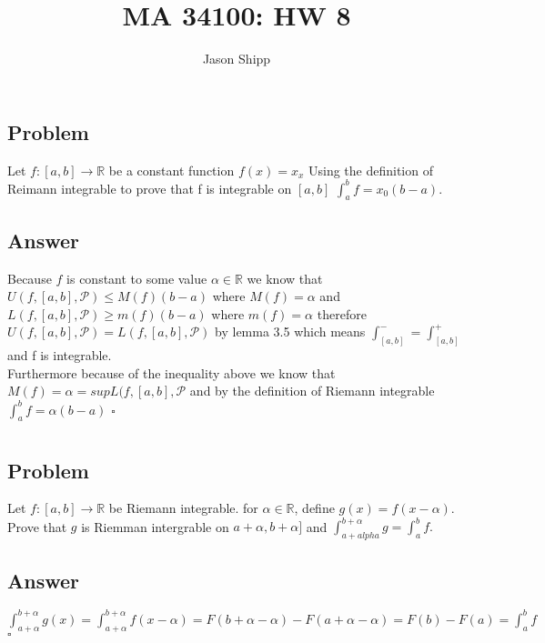 \documentclass{article}
\newcommand\tab[1][1cm]{\hspace*{#1}}
\begin{document}
\title{MA 34100: HW 8}
\author{Jason Shipp}
\maketitle

\section{}

\subsection*{Problem}
Let \(f:[a,b] \to \mathbb{R}\) be a constant function \(f(x) = x_{x}\) Using the definition of Reimann integrable to prove that f is integrable on 
\([a,b]\) \(\int^{b}_{a}f = x_{0}(b-a)\).

\subsection*{Answer}
Because \(f\) is constant to some value \(\alpha \in \mathbb{R}\) we know
that \(U(f, [a,b],\mathcal{P}) \leq M(f)(b-a)\) where \(M(f) = \alpha\)
and \(L(f, [a,b], \mathcal{P}) \geq m(f)(b-a)\) where \(m(f) = \alpha\)
therefore \(U(f, [a,b],\mathcal{P}) = L(f, [a,b],\mathcal{P})\) by lemma 3.5
which means \(\int^{-}_{[a,b]} = \int^{+}_{[a,b]}\) and f is integrable. \\
Furthermore because of the inequality above we know that \(M(f) = \alpha = 
supL(f, [a,b], \mathcal{P}\) and by the definition of Riemann integrable
\(\int_{a}^{b} f = \alpha(b-a)\) \tab \(\square\)


\section{}

\subsection*{Problem}
Let \(f:[a,b] \to \mathbb{R}\) be Riemann integrable. for \(\alpha \in 
\mathbb{R}\), define \(g(x) = f(x-\alpha)\). Prove that \(g\) is Riemman
intergrable on \(a + \alpha, b + \alpha]\) and \(\int^{b+\alpha}_{a+alpha}g = \int^{b}_{a}f.\)

\subsection*{Answer}
\(\int^{b+\alpha}_{a + \alpha}g(x) = \int^{b+\alpha}_{a + \alpha}f(x-\alpha)
= F(b + \alpha - \alpha) - F(a + \alpha - \alpha) = F(b) - F(a) = 
\int^{b}_{a}f\) \tab \(\square\)
\end{document}
